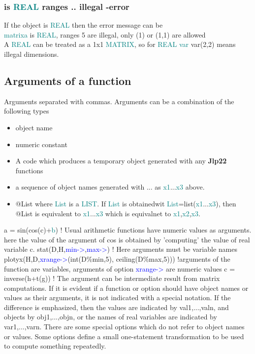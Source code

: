 {\subsubsection{is \textcolor{teal}{REAL} ranges .. illegal  -error} 
\label{isreal} 
If the object is \textcolor{teal}{REAL} then the error message can be \\ 
\textcolor{teal}{matrixa} is \textcolor{teal}{REAL}, ranges            5  are illegal, only (1) or (1,1) are allowed\\ 
A \textcolor{teal}{REAL} can be treated as a 1x1 \textcolor{teal}{MATRIX}, so for \textcolor{teal}{REAL} \textcolor{teal}{var} \textcolor{VioletRed}{var}(2,2) means illegal dimensions. 
\subsection{Arguments of a function} 
\label{arguments} 
Arguments separated with commas. Arguments can be a combination of the following types 
\begin{itemize} 
\item object name 
\item numeric constant 
\item A code which produces a temporary object generated with any \textbf{Jlp22} functions 
\item a sequence of object names generated with ... as \textcolor{teal}{x1}...\textcolor{teal}{x3} above. 
\item @List where \textcolor{teal}{List} is a \textcolor{teal}{LIST}. If \textcolor{teal}{List} is obtainedwit \textcolor{teal}{List}=\textcolor{VioletRed}{list}(\textcolor{teal}{x1}...\textcolor{teal}{x3}), then 
@List is equivalent to \textcolor{teal}{x1}...\textcolor{teal}{x3} which is equivalnet to \textcolor{teal}{x1},\textcolor{teal}{x2},\textcolor{teal}{x3}. 
\end{itemize} 
a = \textcolor{VioletRed}{sin}(\textcolor{VioletRed}{cos}(c)+\textcolor{teal}{b}) ! Usual arithmetic functions have numeric values as arguments. 
here the value of the argument of cos is obtained by 'computing' the 
value of real variable c. 
\textcolor{VioletRed}{stat}(D,H,\textcolor{blue}{min->},\textcolor{blue}{max->}) ! Here arguments must be variable names 
\textcolor{VioletRed}{plotyx}(H,D,\textcolor{blue}{xrange->}(\textcolor{VioletRed}{int}(D\%min,5), \textcolor{VioletRed}{ceiling}(D\%max,5))) !arguments of the function are variables, arguments of option \textcolor{blue}{xrange->} are numeric values 
c = \textcolor{VioletRed}{inverse}(h+\textcolor{VioletRed}{t}(g)) ! The argument can be intermediate result from matrix computations. 
If it is evident if a function or option should have object names or values as their arguments, it 
is not indicated with a special notation. If the difference is emphasized, then the values are 
indicated by val1,...,valn, and objects by obj1,...,objn, or the names of real variables are 
indicated by var1,...,varn. 
There are some special options which do not refer to object names or values. Some options 
define a small one-statement transformation to be used to compute something repeatedly. 
 
}

